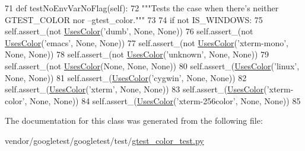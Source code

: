 \begin{DoxyCode}
71   \textcolor{keyword}{def }testNoEnvVarNoFlag(self):
72     \textcolor{stringliteral}{"""Tests the case when there's neither GTEST\_COLOR nor --gtest\_color."""}
73 
74     \textcolor{keywordflow}{if} \textcolor{keywordflow}{not} IS\_WINDOWS:
75       self.assert\_(\textcolor{keywordflow}{not} \hyperlink{namespacegtest__color__test_a96a2e5fa77bff1cba4a791ad1e5bdafa}{UsesColor}(\textcolor{stringliteral}{'dumb'}, \textcolor{keywordtype}{None}, \textcolor{keywordtype}{None}))
76       self.assert\_(\textcolor{keywordflow}{not} \hyperlink{namespacegtest__color__test_a96a2e5fa77bff1cba4a791ad1e5bdafa}{UsesColor}(\textcolor{stringliteral}{'emacs'}, \textcolor{keywordtype}{None}, \textcolor{keywordtype}{None}))
77       self.assert\_(\textcolor{keywordflow}{not} \hyperlink{namespacegtest__color__test_a96a2e5fa77bff1cba4a791ad1e5bdafa}{UsesColor}(\textcolor{stringliteral}{'xterm-mono'}, \textcolor{keywordtype}{None}, \textcolor{keywordtype}{None}))
78       self.assert\_(\textcolor{keywordflow}{not} \hyperlink{namespacegtest__color__test_a96a2e5fa77bff1cba4a791ad1e5bdafa}{UsesColor}(\textcolor{stringliteral}{'unknown'}, \textcolor{keywordtype}{None}, \textcolor{keywordtype}{None}))
79       self.assert\_(\textcolor{keywordflow}{not} \hyperlink{namespacegtest__color__test_a96a2e5fa77bff1cba4a791ad1e5bdafa}{UsesColor}(\textcolor{keywordtype}{None}, \textcolor{keywordtype}{None}, \textcolor{keywordtype}{None}))
80     self.assert\_(\hyperlink{namespacegtest__color__test_a96a2e5fa77bff1cba4a791ad1e5bdafa}{UsesColor}(\textcolor{stringliteral}{'linux'}, \textcolor{keywordtype}{None}, \textcolor{keywordtype}{None}))
81     self.assert\_(\hyperlink{namespacegtest__color__test_a96a2e5fa77bff1cba4a791ad1e5bdafa}{UsesColor}(\textcolor{stringliteral}{'cygwin'}, \textcolor{keywordtype}{None}, \textcolor{keywordtype}{None}))
82     self.assert\_(\hyperlink{namespacegtest__color__test_a96a2e5fa77bff1cba4a791ad1e5bdafa}{UsesColor}(\textcolor{stringliteral}{'xterm'}, \textcolor{keywordtype}{None}, \textcolor{keywordtype}{None}))
83     self.assert\_(\hyperlink{namespacegtest__color__test_a96a2e5fa77bff1cba4a791ad1e5bdafa}{UsesColor}(\textcolor{stringliteral}{'xterm-color'}, \textcolor{keywordtype}{None}, \textcolor{keywordtype}{None}))
84     self.assert\_(\hyperlink{namespacegtest__color__test_a96a2e5fa77bff1cba4a791ad1e5bdafa}{UsesColor}(\textcolor{stringliteral}{'xterm-256color'}, \textcolor{keywordtype}{None}, \textcolor{keywordtype}{None}))
85 
\end{DoxyCode}


The documentation for this class was generated from the following file\+:\begin{DoxyCompactItemize}
\item 
vendor/googletest/googletest/test/\hyperlink{gtest__color__test_8py}{gtest\+\_\+color\+\_\+test.\+py}\end{DoxyCompactItemize}
